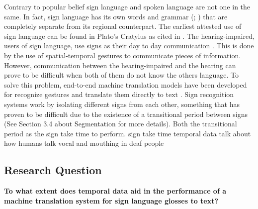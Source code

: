 Contrary to popular belief sign language and spoken language are not one in the same. In fact, sign language has its own words and grammar (\citealp{camgoz2018neural}; \citealp{stokoe2005sign}) that are completely separate from its regional counterpart. The earliest attested use of sign language can be found in Plato's Cratylus \cite{sedley2003plato} as cited in \citet{ruben2005sign}.  The hearing-impaired, users of sign language, use signs as their day to day communication \cite{perniss2007}. This is done by the use of spatial-temporal gestures to communicate pieces of information.  However, communication between the hearing-impaired and the hearing can prove to be difficult \cite{meadow1981interactions} when both of them do not know the others language. To solve this problem, end-to-end machine translation models have been developed for recognize gestures and translate them directly to text \cite{de2020sign}. Sign recognition systems work by isolating different signs from each other, something that has proven to be difficult due to the existence of a transitional period between signs \cite{konradoffentliches} (See Section 3.4 about Segmentation for more details). Both the transitional period as the sign take time to perform.
sign take time
temporal data
talk about how humans talk
vocal and mouthing in deaf people




\cite{garcia2016factored}



\subsection{Research Question}

\textbf{To what extent does temporal data aid in the performance of a machine translation system for sign language glosses to text?}


